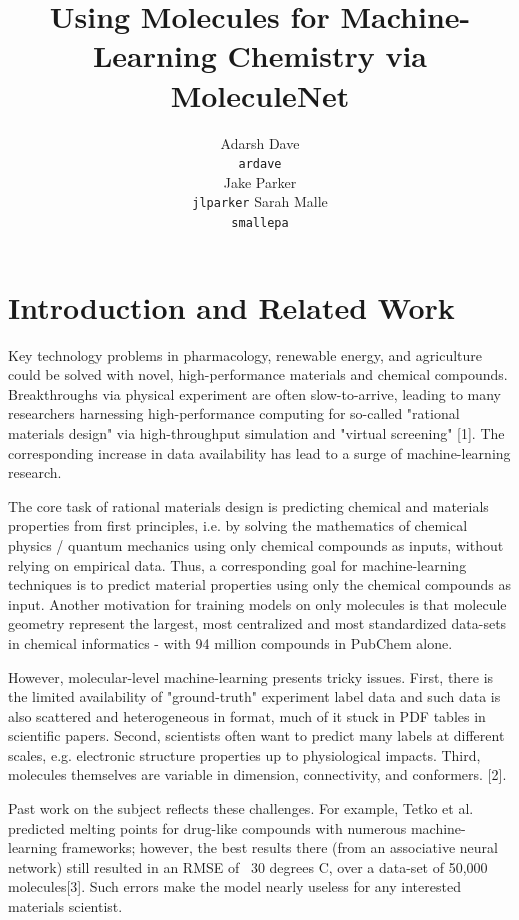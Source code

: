 \documentclass{article}
\title{Using Molecules for Machine-Learning Chemistry via MoleculeNet}
\author{
  Adarsh Dave \\
  \texttt{ardave} \\
  \And
  Jake Parker \\
  \texttt{jlparker}
  \And
  Sarah Malle \\
  \texttt{smallepa}
}
\begin{document}

\maketitle

\section{Introduction and Related Work}
Key technology problems in pharmacology, renewable energy, and agriculture could be solved with novel, high-performance materials and chemical compounds. Breakthroughs via physical experiment are often slow-to-arrive, leading to many researchers harnessing high-performance computing for so-called "rational materials design" via  high-throughput simulation and "virtual screening" [1]. The corresponding increase in data availability has lead to a surge of machine-learning research.

The core task of rational materials design is predicting chemical and materials properties from first principles, i.e. by solving the mathematics of chemical physics / quantum mechanics using only chemical compounds as inputs, without relying on empirical data. Thus, a corresponding goal for machine-learning techniques is to predict material properties using only the chemical compounds as input. Another motivation for training models on only molecules is that molecule geometry represent the largest, most centralized and most standardized data-sets in chemical informatics - with 94 million compounds in PubChem alone.

However, molecular-level machine-learning presents tricky issues. First, there is the limited availability of "ground-truth" experiment label data and  such data is also scattered and heterogeneous in format, much of it stuck in PDF tables in scientific papers. Second, scientists often want to predict many labels at different scales, e.g. electronic structure properties up to physiological impacts. Third, molecules themselves are variable in dimension, connectivity, and conformers. [2].

Past work on the subject reflects these challenges. For example, Tetko et al. predicted melting points for drug-like compounds with numerous machine-learning frameworks; however, the best results there (from an associative neural network) still resulted in an RMSE of ~30 degrees C, over a data-set of 50,000 molecules[3]. Such errors make the model nearly useless for any interested materials scientist.
\end{document}
